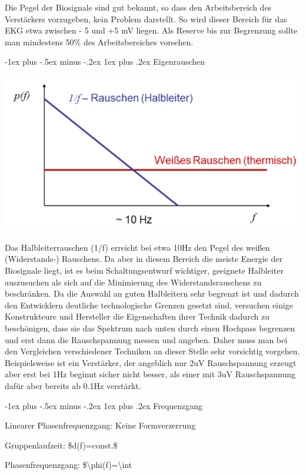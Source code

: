 \documentclass[a4paper]{article}
\makeatletter
\renewcommand{\subsubsection}{\@startsection{subsubsection}{3}{0mm}%
 {-1ex plus -.5ex minus -.2ex}%
 {1ex plus .2ex}%
 {\normalfont\small\bfseries}}
\makeatother
\begin{document}
\begin{multicols}{3}
  Die Pegel der Biosignale sind gut bekannt, so dass den Arbeitsbereich
  des Verstärkers vorzugeben, kein Problem darstellt. So wird dieser
  Bereich für das EKG etwa zwischen - 5 und +5 mV liegen. Als Reserve bis
  zur Begrenzung sollte man mindestens 50\% des Arbeitsbereiches vorsehen.

  \subsubsection{Eigenrauschen}\label{eigenrauschen}

  \includegraphics[width=.5\linewidth]{Assets/Biosignalverarbeitung-eigenrauschen.png}

  Das Halbleiterrauschen (1/f) erreicht bei etwa 10Hz den Pegel des weißen
  (Widerstands-) Rauschens. Da aber in diesem Bereich die meiste Energie
  der Biosignale liegt, ist es beim Schaltungsentwurf wichtiger, geeignete
  Halbleiter auszusuchen als sich auf die Minimierung des
  Widerstandsrauschens zu beschränken. Da die Auswahl an guten Halbleitern
  sehr begrenzt ist und dadurch den Entwicklern deutliche technologische
  Grenzen gesetzt sind, versuchen einige Konstrukteure und Hersteller die
  Eigenschaften ihrer Technik dadurch zu beschönigen, dass sie das
  Spektrum nach unten durch einen Hochpass begrenzen und erst dann die
  Rauschspannung messen und angeben. Daher muss man bei den Vergleichen
  verschiedener Techniken an dieser Stelle sehr vorsichtig vorgehen.
  Beispielsweise ist ein Verstärker, der angeblich nur 2uV Rauschspannung
  erzeugt aber erst bei 1Hz beginnt sicher nicht besser, als einer mit 3uV
  Rauschspannung dafür aber bereits ab 0.1Hz verstärkt.

  \subsubsection{Frequenzgang}\label{frequenzgang}

  Linearer Phasenfrequenzgang: Keine Formverzerrung

  \begin{itemize*}
    \item Gruppenlaufzeit: \$d(f)=const.\$
    \item Phasenfrequenzgang: \$\textbackslash phi(f)=\textbackslash int
  \end{itemize*}


\end{multicols}
\end{document}
